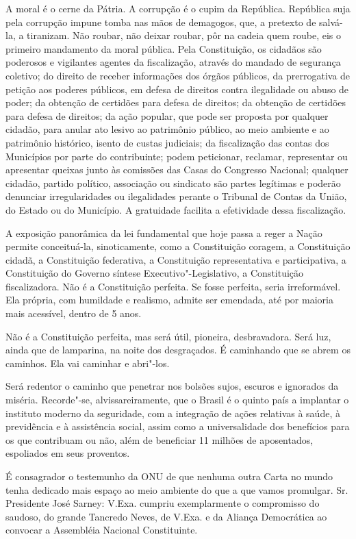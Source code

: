 A moral é o cerne da Pátria. A corrupção é o cupim da República.
República suja pela corrupção impune tomba nas mãos de demagogos, que, a
pretexto de salvá-la, a tiranizam. Não roubar, não deixar roubar, pôr na
cadeia quem roube, eis o primeiro mandamento da moral pública. Pela
Constituição, os cidadãos são poderosos e vigilantes agentes da
fiscalização, através do mandado de segurança coletivo; do direito de
receber informações dos órgãos públicos, da prerrogativa de petição aos
poderes públicos, em defesa de direitos contra ilegalidade ou abuso de
poder; da obtenção de certidões para defesa de direitos; da obtenção de
certidões para defesa de direitos; da ação popular, que pode ser
proposta por qualquer cidadão, para anular ato lesivo ao patrimônio
público, ao meio ambiente e ao patrimônio histórico, isento de custas
judiciais; da fiscalização das contas dos Municípios por parte do
contribuinte; podem peticionar, reclamar, representar ou apresentar
queixas junto às comissões das Casas do Congresso Nacional; qualquer
cidadão, partido político, associação ou sindicato são partes legítimas
e poderão denunciar irregularidades ou ilegalidades perante o Tribunal
de Contas da União, do Estado ou do Município. A gratuidade facilita a
efetividade dessa fiscalização.

A exposição panorâmica da lei fundamental que hoje passa a reger a Nação
permite conceituá-la, sinoticamente, como a Constituição coragem, a
Constituição cidadã, a Constituição federativa, a Constituição
representativa e participativa, a Constituição do Governo síntese
Executivo"-Legislativo, a Constituição fiscalizadora. Não é a
Constituição perfeita. Se fosse perfeita, seria irreformável. Ela
própria, com humildade e realismo, admite ser emendada, até por maioria
mais acessível, dentro de 5 anos.

Não é a Constituição perfeita, mas será útil, pioneira, desbravadora.
Será luz, ainda que de lamparina, na noite dos desgraçados. É caminhando
que se abrem os caminhos. Ela vai caminhar e abri"-los.

Será redentor o caminho que penetrar nos bolsões sujos, escuros e
ignorados da miséria. Recorde"-se, alvissareiramente, que o Brasil é o
quinto país a implantar o instituto moderno da seguridade, com a
integração de ações relativas à saúde, à previdência e à assistência
social, assim como a universalidade dos benefícios para os que
contribuam ou não, além de beneficiar 11 milhões de aposentados,
espoliados em seus proventos.

É consagrador o testemunho da ONU de que nenhuma outra Carta no mundo
tenha dedicado mais espaço ao meio ambiente do que a que vamos
promulgar. Sr. Presidente José Sarney: V.Exa. cumpriu exemplarmente o
compromisso do saudoso, do grande Tancredo Neves, de V.Exa. e da Aliança
Democrática ao convocar a Assembléia Nacional Constituinte.


